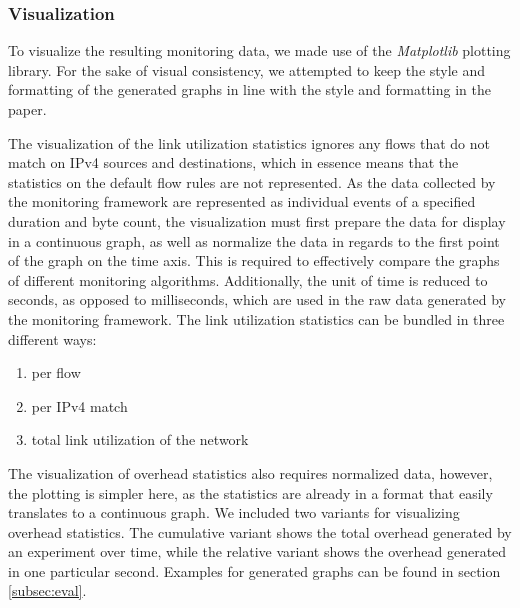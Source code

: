\documentclass[DIV=12]{scrartcl}
\begin{document}
\subsubsection{Visualization}

To visualize the resulting monitoring data, we made use of the \textit{Matplotlib} plotting library.
For the sake of visual consistency, we attempted to keep the style and formatting of the generated graphs in line with the style and formatting in the paper.

The visualization of the link utilization statistics ignores any flows that do not match on IPv4 sources and destinations, which in essence means that
the statistics on the default flow rules are not represented.
As the data collected by the monitoring framework are represented as individual events of a specified duration and byte count, the visualization must first prepare the data for display in a continuous graph, as well as normalize the data in regards to the first point of the graph on the time axis.
This is required to effectively compare the graphs of different monitoring algorithms.
Additionally, the unit of time is reduced to seconds, as opposed to milliseconds, which are used in the raw data generated by the monitoring framework.
The link utilization statistics can be bundled in three different ways:

\begin{enumerate}
    \item per flow
    \item per IPv4 match
    \item total link utilization of the network
\end{enumerate}

The visualization of overhead statistics also requires normalized data, however,
the plotting is simpler here, as the statistics are already in a format that
easily translates to a continuous graph.
We included two variants for visualizing overhead statistics.
The cumulative variant shows the total overhead generated by an experiment over time, while the relative variant shows the overhead generated in one particular second. Examples for generated graphs can be found in section \ref{subsec:eval}.
\end{document}
